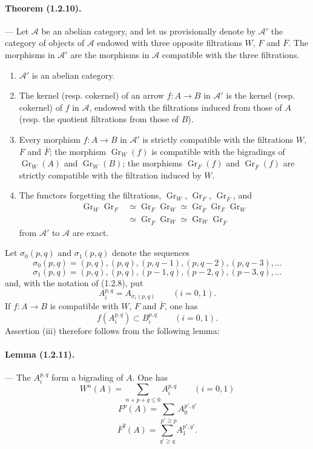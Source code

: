 \documentclass[10pt]{article}
\newcommand{\Gr}{\operatorname{Gr}}
\newcommand{\fg}{\guillemotright}
\newcommand{\og}{\guillemotleft}
\newcommand{\calA}{\mathcal A}
\begin{document}
\paragraph{Theorem (1.2.10).} --- Let $\calA$ be an abelian category, and let us provisionally denote by $\calA'$ the category of objects of $\calA$ endowed with three opposite filtrations $W$, $F$ and $\overline F$. The morphisms in $\calA'$ are the morphisms in $\calA$ compatible with the three filtrations.
\begin{enumerate}[label=(\roman*)]
\item $\calA'$ is an abelian category.
\item The kernel (resp. cokernel) of an arrow $f:A\to B$ in $\calA'$ is the kernel (resp. cokernel) of $f$ in $\calA$, endowed with the filtrations induced from those of $A$ (resp. the quotient filtrations from those of $B$).
\item Every morphism $f:A\to B$ in $\calA'$ is strictly compatible with the filtrations $W$, $F$ and $\overline F$; the morphism $\Gr_W(f)$ is compatible with the bigradings of $\Gr_W(A)$ and $\Gr_W(B)$; the morphisms $\Gr_F(f)$ and $\Gr_{\overline F}(f)$ are strictly compatible with the filtration induced by $W$.
\item The functors \og forgetting the filtrations\fg{}, $\Gr_W$, $\Gr_F$, $\Gr_{\overline F}$, and
\[
\begin{aligned}
\Gr_W\Gr_F&\simeq\Gr_F\Gr_W\simeq\Gr_{\overline F}\Gr_F\Gr_W\\
&\simeq\Gr_{\overline F}\Gr_W\simeq\Gr_W\Gr_{\overline F}
\end{aligned}
\]
from $\calA'$ to $\calA$ are exact.
\end{enumerate}

Let $\sigma_0(p,q)$ and $\sigma_1(p,q)$ denote the sequences
\[
\sigma_0(p,q)=(p,q),(p,q),(p,q-1),(p,q-2),(p,q-3),\ldots
\]
\[
\sigma_1(p,q)=(p,q),(p,q),(p-1,q),(p-2,q),(p-3,q),\ldots
\]
and, with the notation of (1.2.8), put
\[
A_i^{p,q}=A_{\sigma_i(p,q)}\qquad(i=0,1).
\]
If $f:A\to B$ is compatible with $W$, $F$ and $\overline F$, one has
\[
\tag{1.2.10.1}
f(A_i^{p,q})\subset B_i^{p,q}\qquad(i=0,1).
\]
Assertion (iii) therefore follows from the following lemma:

\paragraph{Lemma (1.2.11).} --- The $A_i^{p,q}$ form a bigrading of $A$. One has
\[
\tag{1.2.11.1}
W^n(A)=\sum_{n+p+q\le0} A_i^{p,q}\qquad(i=0,1)
\]
\[
\tag{1.2.11.2}
F^p(A)=\sum_{p'\ge p} A_0^{p',q'}
\]
\[
\tag{1.2.11.3}
\overline F^q(A)=\sum_{q'\ge q} A_1^{p',q'}.
\]
\end{document}
